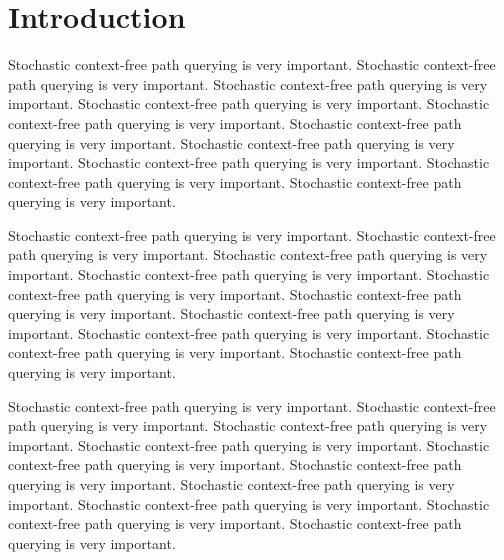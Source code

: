 \documentclass[sigconf, 10pt]{acmart}
\begin{document}



\maketitle

\section{Introduction}

Stochastic context-free path querying is very important. Stochastic context-free path querying is very important. Stochastic context-free path querying is very important. Stochastic context-free path querying is very important. Stochastic context-free path querying is very important. Stochastic context-free path querying is very important. Stochastic context-free path querying is very important. Stochastic context-free path querying is very important. Stochastic context-free path querying is very important. Stochastic context-free path querying is very important.

Stochastic context-free path querying is very important. Stochastic context-free path querying is very important. Stochastic context-free path querying is very important. Stochastic context-free path querying is very important. Stochastic context-free path querying is very important. Stochastic context-free path querying is very important. Stochastic context-free path querying is very important. Stochastic context-free path querying is very important. Stochastic context-free path querying is very important. Stochastic context-free path querying is very important.

Stochastic context-free path querying is very important. Stochastic context-free path querying is very important. Stochastic context-free path querying is very important. Stochastic context-free path querying is very important. Stochastic context-free path querying is very important. Stochastic context-free path querying is very important. Stochastic context-free path querying is very important. Stochastic context-free path querying is very important. Stochastic context-free path querying is very important. Stochastic context-free path querying is very important.
\end{document}
